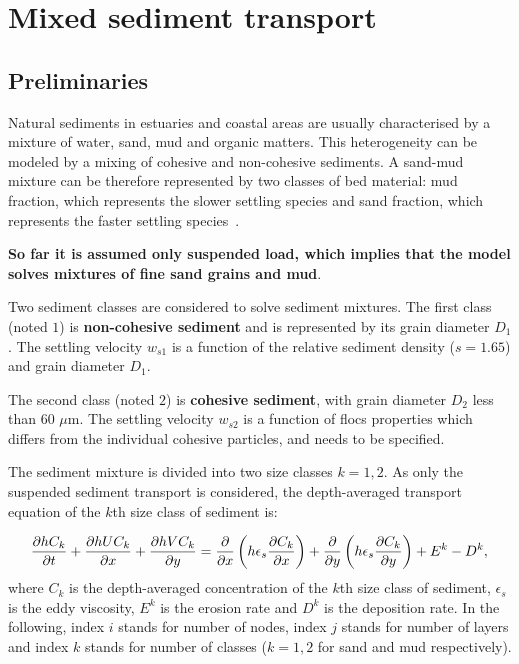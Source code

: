 \chapter[Mixed sediment]{Mixed sediment transport}

\section{Preliminaries}
Natural  sediments  in  estuaries  and  coastal  areas  are  usually characterised  by  a  mixture  of water, sand, mud and organic matters. This heterogeneity can be modeled by a mixing of cohesive and  non-cohesive sediments. A sand-mud mixture can be therefore represented by two classes of bed material: mud  fraction, which represents the slower settling species and sand 
fraction, which represents the faster settling species~\cite{Lan12}.

\textbf{So far it is assumed only suspended load,
which implies that the model solves mixtures of fine sand grains and
mud}.

Two sediment classes are considered to solve sediment mixtures. The first class (noted $1$) is \textbf{non-cohesive sediment} and is represented by its grain diameter $D_1$. The
settling velocity $w_{s1}$ is a function of the relative sediment density
($s=1.65$) and grain diameter $D_1$. 

The second class (noted $2$) is \textbf{cohesive sediment}, with grain diameter $D_2$ less than $60$
$\mu$m. The settling velocity $w_{s2}$ is a function of flocs properties which
differs from the individual cohesive particles, and needs to be specified. 

The sediment mixture is divided into two size classes $k=1,2$. As only the suspended sediment transport is considered, the depth-averaged transport equation of the $k$th size class of sediment is:

\begin{equation}\label{eq:ADE}
\frac{\partial hC_k}{\partial t} + \frac{\partial hUC_k}{\partial
x} + \frac{\partial hVC_k}{\partial y} =\frac{\partial }{%
\partial x} \left(h\epsilon_s\frac{\partial C_k}{\partial x} \right) +%
\frac{\partial }{\partial y} \left( h\epsilon_s\frac{\partial C_k}{%
\partial y} \right)+E^k - D^k, 
\end{equation}%
where $C_k$ is the depth-averaged concentration of the $k$th size class of sediment, $\epsilon_s$ is the eddy viscosity, $E^k$ is the erosion rate and $D^k$ is the deposition rate. In the following, index $i$ stands for number of nodes, index $j$ stands for number of layers and index $k$ stands for number of classes ($k=1,2$ for sand and mud respectively).\\

